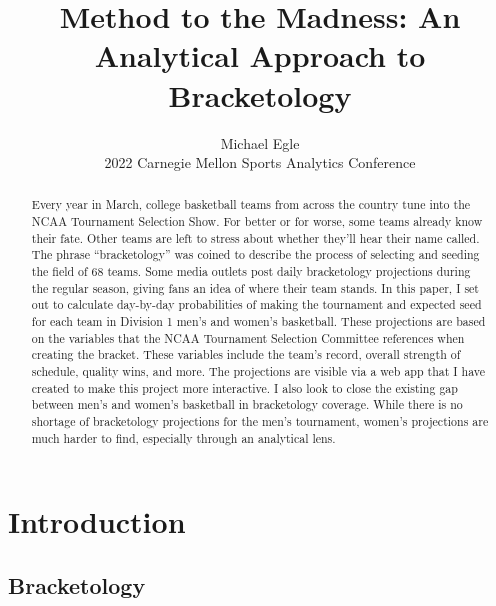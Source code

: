 \documentclass{article}
\title{Method to the Madness: An Analytical Approach to Bracketology}
\author{Michael Egle\\
2022 Carnegie Mellon Sports Analytics Conference}
\begin{document}
\maketitle

\begin{abstract}

Every year in March, college basketball teams from across the country tune into the NCAA Tournament Selection Show. For better or for worse, some teams already know their fate. Other teams are left to stress about whether they’ll hear their name called. The phrase “bracketology” was coined to describe the process of selecting and seeding the field of 68 teams. Some media outlets post daily bracketology projections during the regular season, giving fans an idea of where their team stands. In this paper, I set out to calculate day-by-day probabilities of making the tournament and expected seed for each team in Division 1 men’s and women’s basketball. These projections are based on the variables that the NCAA Tournament Selection Committee references when creating the bracket. These variables include the team’s record, overall strength of schedule, quality wins, and more. The projections are visible via a web app that I have created to make this project more interactive. I also look to close the existing gap between men’s and women’s basketball in bracketology coverage. While there is no shortage of bracketology projections for the men’s tournament, women’s projections are much harder to find, especially through an analytical lens.

\end{abstract}

\section{Introduction}

\subsection{Bracketology}
\end{document}
